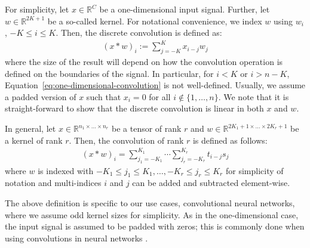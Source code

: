 \begin{example}
  For simplicity, let $x \in \mathbb{R}^C$ be a one-dimensional input signal.
  Further, let $w \in \mathbb{R}^{2K + 1}$ be a so-called kernel.
  For notational convenience, we index $w$ using $w_i$, $-K \leq i \leq K$.
  Then, the discrete convolution is defined as:
  \begin{align}
    (x\ast w)_i := \sum_{j = -K}^K x_{i - j}w_j\label{eq:one-dimensional-convolution}
  \end{align}
  where the size of the result will depend on how the convolution operation
  is defined on the boundaries of the signal. In particular, for
  $i < K$ or $i > n - K$, Equation~\eqref{eq:one-dimensional-convolution}
  is not well-defined. Usually, we assume a padded version of $x$ such that 
  $x_i = 0$ for all $i \notin \{1,\ldots,n\}$. We note that it is straight-forward
  to show that the discrete convolution is linear in both $x$ and $w$.
\end{example}


\begin{definition}
  \label{def:deep-learning-convolutional-layer}
  In general, let $x \in \mathbb{R}^{n_1 \times \ldots \times n_r}$ be a tensor
  of rank $r$ and $w \in \mathbb{R}^{2K_1 + 1 \times \ldots \times 2K_r + 1}$ be a
  kernel of rank $r$. Then, the convolution of rank $r$ is defined as follows:
  \begin{align}
    (x\ast w)_i = \sum_{j_1 = -K_1}^{K_1} \cdots \sum_{j_r = -K_r}^{K_r} t_{i - j} s_j
    \label{eq:deep-learning-convolution}
  \end{align}
  where $w$ is indexed with $-K_1 \leq j_1 \leq K_1, \ldots, -K_r \leq j_r \leq K_r$
  for simplicity of notation and multi-indices $i$ and $j$ can be added and subtracted
  element-wise.
\end{definition}

The above definition is specific to our use cases, \ie convolutional neural networks,
where we assume odd kernel sizes for simplicity. As in the one-dimensional case,
the input signal
is assumed to be padded with zeros; this is commonly done when using convolutions
in neural networks \cite[Section 9.5]{GoodfellowBengioCourville:2016}.

